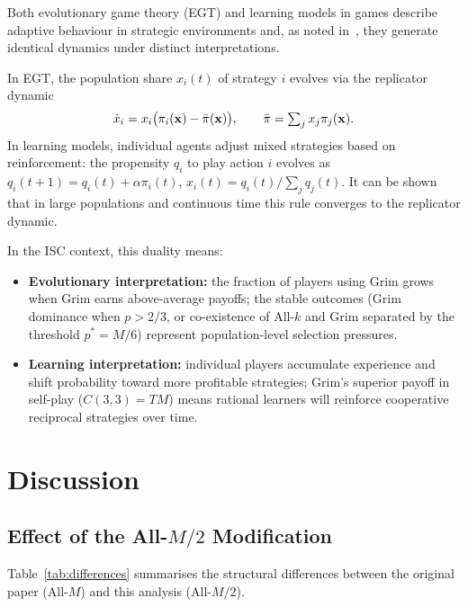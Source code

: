 \documentclass[12pt,a4paper]{article}
\begin{document}
Both evolutionary game theory (EGT) and learning models in games describe
adaptive behaviour in strategic environments and, as noted in~\cite{LK2026},
they generate identical dynamics under distinct interpretations.

In EGT, the population share $x_i(t)$ of strategy $i$ evolves via the
replicator dynamic
\[
  \dot{x}_i = x_i\bigl(\pi_i({\bf x})-\bar\pi({\bf x})\bigr),
  \qquad \bar\pi = \textstyle\sum_j x_j\pi_j({\bf x}).
\]
In learning models, individual agents adjust mixed strategies based on
reinforcement: the propensity $q_i$ to play action $i$ evolves as
$q_i(t+1) = q_i(t)+\alpha\pi_i(t)$, $x_i(t)=q_i(t)/\sum_j q_j(t)$.
It can be shown~\cite{BorgersSarin1997} that in large populations and
continuous time this rule converges to the replicator dynamic.

In the ISC context, this duality means:
\begin{itemize}
  \item \textbf{Evolutionary interpretation:} the fraction of players using
        Grim grows when Grim earns above-average payoffs; the stable outcomes
        (Grim dominance when $p>2/3$, or co-existence of All-$k$ and Grim
        separated by the threshold $p^*=M/6$) represent population-level
        selection pressures.
  \item \textbf{Learning interpretation:} individual players accumulate
        experience and shift probability toward more profitable strategies;
        Grim's superior payoff in self-play ($C(3,3)=TM$) means rational
        learners will reinforce cooperative reciprocal strategies over time.
\end{itemize}

\section{Discussion}
\label{sec:discussion}

\subsection{Effect of the All-\texorpdfstring{$M/2$}{M/2} Modification}

Table~\ref{tab:differences} summarises the structural differences between the
original paper (All-$M$) and this analysis (All-$M/2$).
\end{document}
